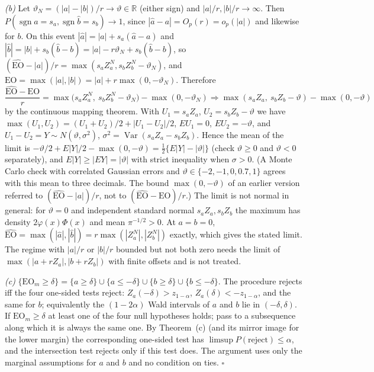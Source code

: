 \emph{(b)} Let $\vartheta_N=(|a|-|b|)/r\to\vartheta\in\mathbb R$ (either sign) and $|a|/r,|b|/r\to\infty$. Then $P(\operatorname{sgn}\hat a=s_a,\operatorname{sgn}\hat b=s_b)\to1$, since $|\hat a-a|=O_p(r)=o_p(|a|)$ and likewise for $b$. On this event $|\hat a|=|a|+s_a(\hat a-a)$ and $|\hat b|=|b|+s_b(\hat b-b)=|a|-r\vartheta_N+s_b(\hat b-b)$, so $(\widehat{\mathrm{EO}}-|a|)/r=\max(s_aZ_a^N,s_bZ_b^N-\vartheta_N)$, and $\mathrm{EO}=\max(|a|,|b|)=|a|+r\max(0,-\vartheta_N)$. Therefore
\[
\frac{\widehat{\mathrm{EO}}-\mathrm{EO}}{r}=\max\big(s_aZ_a^N,\ s_bZ_b^N-\vartheta_N\big)-\max(0,-\vartheta_N)\Rightarrow\max(s_aZ_a,\ s_bZ_b-\vartheta)-\max(0,-\vartheta)
\]
by the continuous mapping theorem. With $U_1=s_aZ_a$, $U_2=s_bZ_b-\vartheta$ we have $\max(U_1,U_2)=(U_1+U_2)/2+|U_1-U_2|/2$, $EU_1=0$, $EU_2=-\vartheta$, and $U_1-U_2=Y\sim N(\vartheta,\sigma^2)$, $\sigma^2=\operatorname{Var}(s_aZ_a-s_bZ_b)$. Hence the mean of the limit is $-\vartheta/2+E|Y|/2-\max(0,-\vartheta)=\tfrac12\{E|Y|-|\vartheta|\}$ (check $\vartheta\ge0$ and $\vartheta<0$ separately), and $E|Y|\ge|EY|=|\vartheta|$ with strict inequality when $\sigma>0$. (A Monte Carlo check with correlated Gaussian errors and $\vartheta\in\{-2,-1,0,0.7,1\}$ agrees with this mean to three decimals. The bound $\max(0,-\vartheta)$ of an earlier version referred to $(\widehat{\mathrm{EO}}-|a|)/r$, not to $(\widehat{\mathrm{EO}}-\mathrm{EO})/r$.) The limit is not normal in general: for $\vartheta=0$ and independent standard normal $s_aZ_a,s_bZ_b$ the maximum has density $2\varphi(x)\Phi(x)$ and mean $\pi^{-1/2}>0$. At $a=b=0$, $\widehat{\mathrm{EO}}=\max(|\hat a|,|\hat b|)=r\max(|Z_a^N|,|Z_b^N|)$ exactly, which gives the stated limit. The regime with $|a|/r$ or $|b|/r$ bounded but not both zero needs the limit of $\max(|a+rZ_a|,|b+rZ_b|)$ with finite offsets and is not treated.

\emph{(c)} $\{\mathrm{EO}_m\ge\delta\}=\{a\ge\delta\}\cup\{a\le-\delta\}\cup\{b\ge\delta\}\cup\{b\le-\delta\}$. The procedure rejects iff the four one-sided tests reject: $Z_a(-\delta)>z_{1-\alpha}$, $Z_a(\delta)<-z_{1-\alpha}$, and the same for $b$; equivalently the $(1-2\alpha)$ Wald intervals of $a$ and $b$ lie in $(-\delta,\delta)$. If $\mathrm{EO}_m\ge\delta$ at least one of the four null hypotheses holds; pass to a subsequence along which it is always the same one. By Theorem~(c) (and its mirror image for the lower margin) the corresponding one-sided test has $\limsup P(\text{reject})\le\alpha$, and the intersection test rejects only if this test does. The argument uses only the marginal assumptions for $a$ and $b$ and no condition on ties. $\square$
